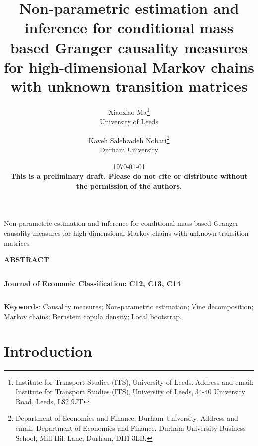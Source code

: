 \documentclass[harvard,11pt]{article}
\renewcommand{\cite}{\citeasnoun}
\renewcommand{\baselinestretch}{1.5}
\begin{document}
\title{{Non-parametric estimation and inference for conditional mass based Granger causality measures for high-dimensional Markov chains with unknown transition matrices}}
\author{Xiaoxiao Ma\thanks{%
Institute for Transport Studies (ITS), University of Leeds. Address and email:
Institute for Transport Studies (ITS), University of Leeds, 34-40 University Road, Leeds, LS2 9JT}\\
University of Leeds\and Kaveh Salehzadeh Nobari\thanks{%
Department of Economics and Finance, Durham University. Address and email:
Department of Economics and Finance, Durham University Business School, Mill
Hill Lane, Durham, DH1 3LB.}\\
Durham University}
\date{\today \\
\textbf{This is a preliminary draft. Please do not cite or distribute without the permission of the authors.}}
\maketitle

\setlength{\baselineskip}{18pt}\pagestyle{plain}\newpage

\begin{center}
$\left. {}\right. ${\LARGE Non-parametric estimation and inference for conditional mass based Granger causality measures for high-dimensional Markov chains with unknown transition matrices}%
\begin{equation*}
\end{equation*}

\textbf{ABSTRACT}
\end{center}

\noindent \lipsum[2-3]

$\left. {}\right.$

\noindent \textbf{Journal of Economic Classification: C12, C13, C14%
}

$\left. {}\right. $

\noindent \textbf{Keywords}: Causality measures; Non-parametric estimation; Vine decomposition; Markov chains; Bernstein copula density; Local bootstrap.\newpage

\tableofcontents%
\newpage

\section{Introduction \label{Introduction}}
\end{document}
